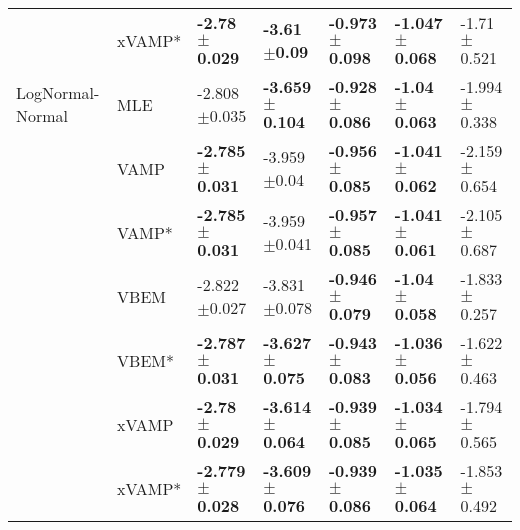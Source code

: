 \begin{tabular}{lllllll}
                 & xVAMP* &   \textbf{-2.78$\pm$0.029} &    \textbf{-3.61$\pm$0.09} &  \textbf{-0.973$\pm$0.098} &  \textbf{-1.047$\pm$0.068} &            -1.71$\pm$0.521 \\
LogNormal-Normal & MLE &           -2.808$\pm$0.035 &  \textbf{-3.659$\pm$0.104} &  \textbf{-0.928$\pm$0.086} &   \textbf{-1.04$\pm$0.063} &           -1.994$\pm$0.338 \\
                 & VAMP &  \textbf{-2.785$\pm$0.031} &            -3.959$\pm$0.04 &  \textbf{-0.956$\pm$0.085} &  \textbf{-1.041$\pm$0.062} &           -2.159$\pm$0.654 \\
                 & VAMP* &  \textbf{-2.785$\pm$0.031} &           -3.959$\pm$0.041 &  \textbf{-0.957$\pm$0.085} &  \textbf{-1.041$\pm$0.061} &           -2.105$\pm$0.687 \\
                 & VBEM &           -2.822$\pm$0.027 &           -3.831$\pm$0.078 &  \textbf{-0.946$\pm$0.079} &   \textbf{-1.04$\pm$0.058} &           -1.833$\pm$0.257 \\
                 & VBEM* &  \textbf{-2.787$\pm$0.031} &  \textbf{-3.627$\pm$0.075} &  \textbf{-0.943$\pm$0.083} &  \textbf{-1.036$\pm$0.056} &           -1.622$\pm$0.463 \\
                 & xVAMP &   \textbf{-2.78$\pm$0.029} &  \textbf{-3.614$\pm$0.064} &  \textbf{-0.939$\pm$0.085} &  \textbf{-1.034$\pm$0.065} &           -1.794$\pm$0.565 \\
                 & xVAMP* &  \textbf{-2.779$\pm$0.028} &  \textbf{-3.609$\pm$0.076} &  \textbf{-0.939$\pm$0.086} &  \textbf{-1.035$\pm$0.064} &           -1.853$\pm$0.492 \\
\bottomrule
\end{tabular}

